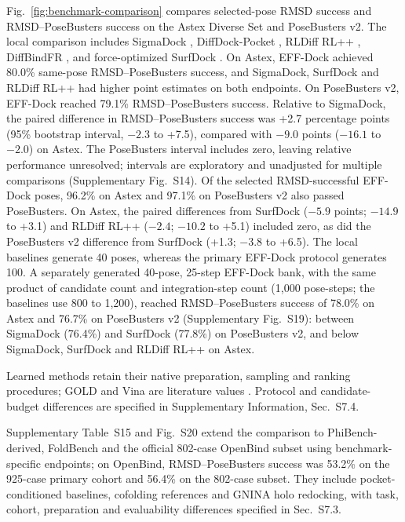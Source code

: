 \documentclass{article}
\newcommand{\citep}[1]{\cite{#1}}
\begin{document}
Fig.~\ref{fig:benchmark-comparison} compares selected-pose RMSD success and RMSD--PoseBusters success on the Astex Diverse Set and PoseBusters v2.
The local comparison includes SigmaDock \citep{prat2025sigmadock}, DiffDock-Pocket \citep{plainer2023diffdockpocket}, RLDiff RL++ \citep{broster2026rldiff}, DiffBindFR \citep{zhu2024diffbindfr}, and force-optimized SurfDock \citep{cao2025surfdock}.
On Astex, EFF-Dock achieved 80.0\% same-pose RMSD--PoseBusters success, and SigmaDock, SurfDock and RLDiff RL++ had higher point estimates on both endpoints.
On PoseBusters v2, EFF-Dock reached 79.1\% RMSD--PoseBusters success. Relative to SigmaDock, the paired difference in RMSD--PoseBusters success was +2.7 percentage points (95\% bootstrap interval, \(-2.3\) to +7.5), compared with \(-9.0\) points (\(-16.1\) to \(-2.0\)) on Astex. The PoseBusters interval includes zero, leaving relative performance unresolved; intervals are exploratory and unadjusted for multiple comparisons (Supplementary Fig.~S14).
Of the selected RMSD-successful EFF-Dock poses, 96.2\% on Astex and 97.1\% on PoseBusters v2 also passed PoseBusters. On Astex, the paired differences from SurfDock (\(-5.9\) points; \(-14.9\) to +3.1) and RLDiff RL++ (\(-2.4\); \(-10.2\) to +5.1) included zero, as did the PoseBusters v2 difference from SurfDock (+1.3; \(-3.8\) to +6.5).
The local baselines generate 40 poses, whereas the primary EFF-Dock protocol generates 100. A separately generated 40-pose, 25-step EFF-Dock bank, with the same product of candidate count and integration-step count (1,000 pose-steps; the baselines use 800 to 1,200), reached RMSD--PoseBusters success of 78.0\% on Astex and 76.7\% on PoseBusters v2 (Supplementary Fig.~S19): between SigmaDock (76.4\%) and SurfDock (77.8\%) on PoseBusters v2, and below SigmaDock, SurfDock and RLDiff RL++ on Astex.

Learned methods retain their native preparation, sampling and ranking procedures; GOLD and Vina are literature values \citep{buttenschoen2024posebusters}. Protocol and candidate-budget differences are specified in Supplementary Information, Sec.~S7.4.

Supplementary Table~S15 and Fig.~S20 extend the comparison to PhiBench-derived, FoldBench and the official 802-case OpenBind subset using benchmark-specific endpoints; on OpenBind, RMSD--PoseBusters success was 53.2\% on the 925-case primary cohort and 56.4\% on the 802-case subset. They include pocket-conditioned baselines, cofolding references and GNINA holo redocking, with task, cohort, preparation and evaluability differences specified in Sec.~S7.3.
\end{document}
